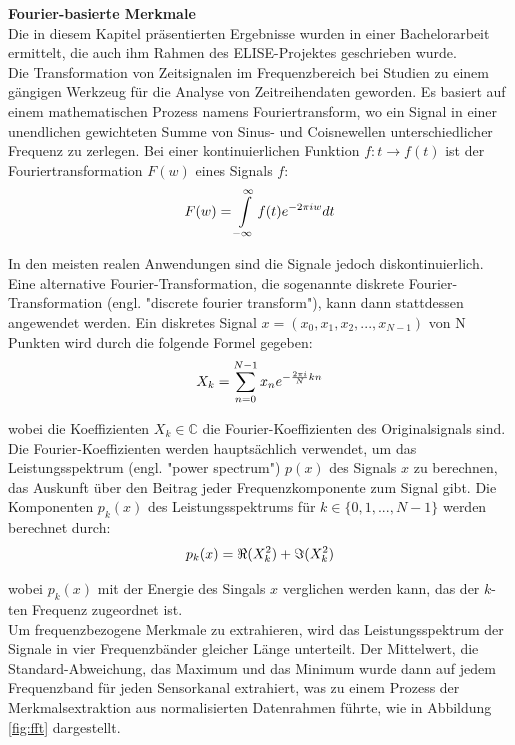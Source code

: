 \textbf{Fourier-basierte Merkmale \\}
Die in diesem Kapitel präsentierten Ergebnisse wurden in einer Bachelorarbeit \cite{bsclittau} ermittelt, die auch ihm Rahmen des ELISE-Projektes geschrieben wurde. \\

Die Transformation von Zeitsignalen im Frequenzbereich bei Studien zu einem gängigen Werkzeug für die Analyse von Zeitreihendaten geworden. Es basiert auf einem mathematischen Prozess namens Fouriertransform, wo ein Signal in einer unendlichen gewichteten Summe von Sinus- und Coisnewellen unterschiedlicher Frequenz zu zerlegen.
Bei einer kontinuierlichen Funktion $ f : t \rightarrow f(t) $ ist der Fouriertransformation $ F(w) $ eines Signals $ f $: 
\begin{equation} 
\Large{ F(w) = \int\limits_{-\infty}^{\infty}{f(t)e^{-2\pi{}iw}dt}} 
\label{equ:fourier} \end{equation}
\vspace{0.2cm}

In den meisten realen Anwendungen sind die Signale jedoch diskontinuierlich. 
Eine alternative Fourier-Transformation, die sogenannte diskrete Fourier-Transformation (engl. "discrete fourier transform"), kann dann stattdessen angewendet werden.
Ein diskretes Signal $ x = (x_{0},x_{1},x_{2},...,x_{N-1}) $ von N Punkten wird durch die folgende Formel gegeben:
\begin{equation} 
\Large{ X_{k} = \sum\limits_{n=0}^{N-1} x_{n} e^{- \frac{2 \pi i}{N} kn} } 
\end{equation} 
\vspace{0.2cm}

wobei die Koeffizienten $ X_{k} \in \mathbb{C} $ die Fourier-Koeffizienten des Originalsignals sind.
Die Fourier-Koeffizienten werden hauptsächlich verwendet, um das Leistungsspektrum (engl. "power spectrum") $ p(x) $ des Signals $x$ zu berechnen, das Auskunft über den Beitrag jeder Frequenzkomponente zum Signal gibt. 
Die Komponenten $ p_{k}(x) $ des Leistungsspektrums für $ k \in \lbrace 0,1,...,N-1 \rbrace$ werden berechnet durch: 
\begin{equation} 
\Large{ p_{k}(x) = \Re(X_{k}^{2})+\Im(X_{k}^{2}) } 
\end{equation} 

wobei $ p_{k}(x) $ mit der Energie des Singals $x$ verglichen werden kann, das der $k$-ten Frequenz zugeordnet ist. \\


Um frequenzbezogene Merkmale zu extrahieren, wird das Leistungsspektrum der Signale in vier Frequenzbänder gleicher Länge unterteilt.
Der Mittelwert, die Standard-Abweichung, das Maximum und das Minimum wurde dann auf jedem Frequenzband für jeden Sensorkanal extrahiert, was zu einem Prozess der Merkmalsextraktion aus normalisierten Datenrahmen führte, wie in Abbildung \ref{fig:fft} dargestellt. 

